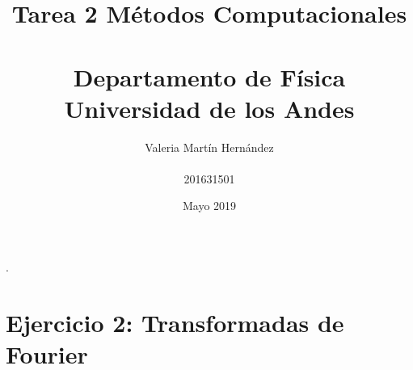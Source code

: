 \documentclass[11pt,letterpaper]{exam}
\title{Tarea 2 Métodos Computacionales\\\\ Departamento de Física \\ Universidad de los Andes}
\author{Valeria Martín Hernández\\\\201631501}
\date{Mayo 2019}
\begin{document}
\maketitle
.\newline\newline\newline\newline\newline\newline\newline\newline\newline\newline\newline\newline\newline\newline\newline\newline\newline\newline\newline\newline\newline\newline\newline\newline\newline\newline

\maketitle

\section{Ejercicio 2: Transformadas de Fourier}
\end{document}
